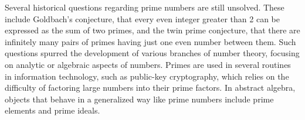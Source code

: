 Several historical questions regarding prime numbers are still unsolved. These
include Goldbach's conjecture, that every even integer greater than 2 can be
expressed as the sum of two primes, and the twin prime conjecture, that there
are infinitely many pairs of primes having just one even number between
them. Such questions spurred the development of various branches of number
theory, focusing on analytic or algebraic aspects of numbers. Primes are used in
several routines in information technology, such as public-key cryptography,
which relies on the difficulty of factoring large numbers into their prime
factors. In abstract algebra, objects that behave in a generalized way like
prime numbers include prime elements and prime ideals.
